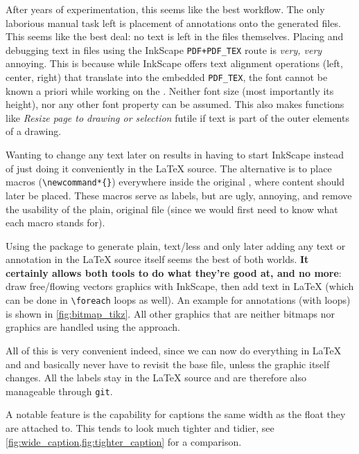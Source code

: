 \begin{description}
          After years of experimentation, this seems like the best workflow.
          The only laborious manual task left is placement of annotations onto the
          generated  files.
          This seems like the best deal: no text is left in the
           files themselves.
          Placing and debugging text in  files using
          the InkScape \textrightarrow{} \verb|PDF+PDF_TEX| route is \emph{very, very}
          annoying.
          This is because while InkScape offers text alignment operations
          (left, center, right) that translate into the embedded \verb|PDF_TEX|,
          the font cannot be known a priori while working on the
          .
          Neither font size (most importantly its height), nor any other font
          property can be assumed.
          This also makes functions like \emph{Resize page to drawing or selection}
          futile if text is part of the outer elements of a drawing.

          Wanting to change any text later on results in having to start InkScape
          instead of just doing it conveniently in the \LaTeX{} source.
          The alternative is to place macros (\verb|\newcommand*{}|) everywhere
          inside the original , where content should
          later be placed.
          These macros serve as labels, but are ugly, annoying, and remove the
          usability of the plain, original  file
          (since we would first need to know what each macro stands for).

          Using the  package to generate plain, text\-/less
           and only later adding any
          text or annotation in the \LaTeX{} source itself seems the best of both
          worlds.
          \textbf{It certainly allows both tools to do what they're good at, and no more}:
          draw free\-/flowing vectors graphics with InkScape, then add text in
          \LaTeX{} (which can be done in \verb|\foreach| loops as well).
          An example for annotations (with loops) is shown in \cref{fig:bitmap_tikz}.
          All other graphics that are neither bitmaps nor  graphics are
          handled using the  approach.

          All of this is very convenient indeed, since we can now do everything in
          \LaTeX{} and  and basically never have to revisit the base
           file, unless the graphic itself changes.
          All the labels stay in the \LaTeX{} source and are therefore also manageable
          through \texttt{git}.
    \item[\ctanpackage{floatrow}]
          A notable feature is the capability for captions the same width as the
          float they are attached to.
          This tends to look much tighter and tidier, see
          \cref{fig:wide_caption,fig:tighter_caption} for a comparison.


\end{description}
